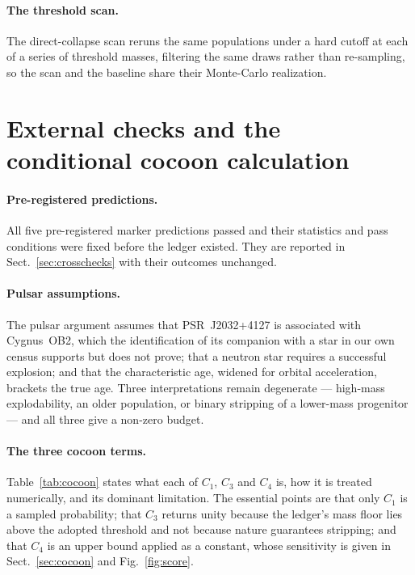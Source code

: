 \documentclass{aa}
\begin{document}
\paragraph{The threshold scan.}
The direct-collapse scan reruns the same populations under a hard cutoff at each
of a series of threshold masses, filtering the same draws rather than
re-sampling, so the scan and the baseline share their Monte-Carlo realization.

\section{External checks and the conditional cocoon
calculation}\label{app:external}

\paragraph{Pre-registered predictions.}
All five pre-registered marker predictions passed and their statistics and pass conditions
were fixed before the ledger existed. They are reported in
Sect.~\ref{sec:crosschecks} with their outcomes unchanged.

\paragraph{Pulsar assumptions.}
The pulsar argument assumes that PSR~J2032+4127 is associated with Cygnus~OB2,
which the identification of its companion with a star in our own census
supports but does not prove; that a neutron star requires a successful
explosion; and that the characteristic age, widened for orbital acceleration,
brackets the true age. Three interpretations remain degenerate --- high-mass
explodability, an older population, or binary stripping of a lower-mass
progenitor --- and all three give a non-zero budget.

\paragraph{The three cocoon terms.}
Table~\ref{tab:cocoon} states what each of $C_1$, $C_3$ and $C_4$ is, how it is
treated numerically, and its dominant limitation. The essential points are that
only $C_1$ is a sampled probability; that $C_3$ returns unity because the
ledger's mass floor lies above the adopted threshold and not because nature
guarantees stripping; and that $C_4$ is an upper bound applied as a constant,
whose sensitivity is given in Sect.~\ref{sec:cocoon} and
Fig.~\ref{fig:score}.
\end{document}
